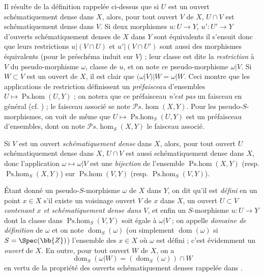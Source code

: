 \begin{env}[20.2.2]
Il résulte de la définition rappelée ci-dessus que si $U$ est un ouvert schématiquement dense dans $X$, alors, pour tout ouvert $V$ de $X$, $U\cap V$ est schématiquement dense dans $V$.
Si deux morphismes $u:U\to Y$, $u':U'\to Y$ d'ouverts schématiquement denses de $X$ dans $Y$ sont équivalents il s'ensuit donc que leurs restrictions $u|(V\cap U)$ et $u'|(V\cap U')$ sont aussi des morphismes équivalents (pour le préschéma induit sur $V$) ; leur classe est dite la \emph{restriction} à $V$ du pseudo-morphisme $\omega$, classe de $u$, et on note ce pseudo-morphisme $\omega|V$.
Si $W\subset V$ est un ouvert de $X$, il est clair que $(\omega|V)|W=\omega|W$.
Ceci montre que les applications de restriction définissent un \emph{préfaisceau} d'ensembles $U\mapsto\operatorname{Ps.hom}(U,Y)$ ; on notera que ce préfaisceau \emph{n'est pas} un faisceau en général (cf. ) ; le faisceau associé se note $\mathscr{P}\!s.\!\operatorname{hom}(X,Y)$.
Pour les pseudo-$S$-morphismes, on voit de même que $U\mapsto\operatorname{Ps.hom}_S(U,Y)$ est un préfaisceau d'ensembles, dont on note $\mathscr{P}\!s.\!\operatorname{hom}_S(X,Y)$ le faisceau associé.

Si $V$ est un ouvert \emph{schématiquement dense} dans $X$, alors, pour tout ouvert $U$ schématiquement dense dans $X$, $U\cap V$ est aussi schématiquement dense dans $X$, donc l'application $\omega\mapsto\omega|V$ est une \emph{bijection} de l'ensemble $\operatorname{Ps.hom}(X,Y)$ (resp. $\operatorname{Ps.hom}_S(X,Y)$) sur $\operatorname{Ps.hom}(V,Y)$ (resp. $\operatorname{Ps.hom}_S(V,Y)$).
\end{env}

\begin{env}[20.2.3]
Étant donné un pseudo-$S$-morphisme $\omega$ de $X$ dans $Y$, on dit qu'il est \emph{défini} en un point $x\in X$ s'il existe un voisinage ouvert $V$ de $x$ dans $X$, un ouvert $U\subset V$ \emph{contenant $x$ et schématiquement dense dans $V$}, et enfin un $S$-morphisme $u:U\to Y$ dont la classe dans $\operatorname{Ps.hom}_S(V,Y)$ soit égale à $\omega|V$  ; on appelle \emph{domaine de définition} de $\omega$ et on note $\operatorname{dom}_S(\omega)$ (ou simplement $\operatorname{dom}(\omega)$ si $S=\Spec(\bb{Z})$) l'ensemble des $x\in X$ où $\omega$ est défini ; c'est évidemment un \emph{ouvert} de $X$.
En outre, pour tout ouvert $W$ de $X$, on a
\[
\label{IV.20.2.3.1}
  \operatorname{dom}_S(\omega|W)=(\operatorname{dom}_S(\omega))\cap W
  \tag{20.2.3.1}
\]
en vertu de la propriété des ouverts schématiquement denses rappelée dans .
\end{env}

